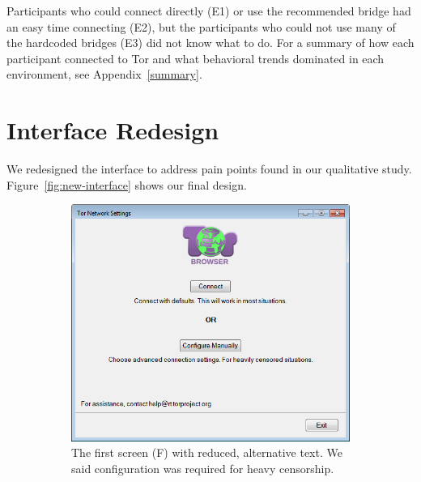 \documentclass[USenglish,oneside,twocolumn]{article}
\begin{document}
Participants who could connect directly (E1) or use the recommended bridge had an easy time connecting (E2), but the participants who could not use many of the hardcoded bridges (E3) did not know what to do. For a summary of how each participant connected to Tor and what behavioral trends dominated in each environment, see Appendix~\ref{summary}. 

\section{Interface Redesign}
\label{sec:design} 
We redesigned the interface to address pain points found in our qualitative study. Figure~\ref{fig:new-interface} shows our final design.

\begin{figure}
\centering
\begin{subfigure}[b]{0.30\textwidth}
	\includegraphics[width=\textwidth]{screenshots/NEW-first.png}
	\centering\captionsetup{width=1.5\linewidth}%
	\caption{The first screen (F) with reduced, alternative text. We said configuration was required for heavy censorship.}
	\label{fig:new-first}
\end{subfigure}
~~~~~~~~~~~~~~~~~~~~~~~~~
\begin{subfigure}[b]{0.30\textwidth}

\end{subfigure}
\end{figure}
\end{document}
